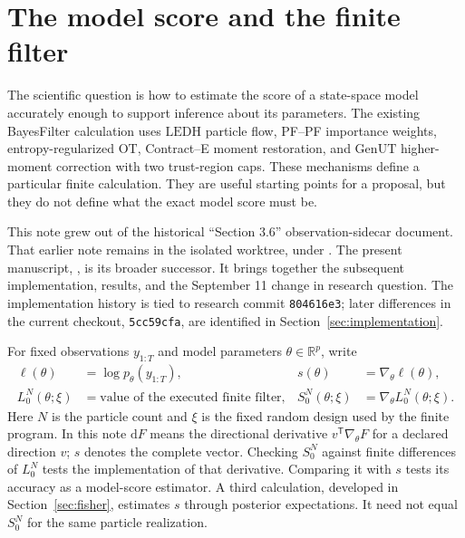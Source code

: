 \documentclass[11pt]{article}
\newcommand{\R}{\mathbb{R}}
\newcommand{\dd}{\mathrm{d}}
\newcommand{\LEDH}{\ensuremath{\mathrm{LEDH}}}
\newcommand{\GenUT}{\ensuremath{\mathrm{GenUT}}}
\newcommand{\OT}{\ensuremath{\mathrm{OT}}}
\begin{document}
\section{The model score and the finite filter}
\label{sec:question}

The scientific question is how to estimate the score of a state-space model
accurately enough to support inference about its parameters. The existing
BayesFilter calculation uses \LEDH{} particle flow, PF--PF importance weights,
entropy-regularized \OT{}, Contract--E moment restoration, and \GenUT{}
higher-moment correction with two trust-region caps. These mechanisms define
a particular finite calculation. They are useful starting points for a
proposal, but they do not define what the exact model score must be.

This note grew out of the historical ``Section 3.6'' observation-sidecar
document. That earlier note remains in the isolated
 worktree, under
. The present manuscript,
, is its
broader successor. It brings together the subsequent implementation, results,
and the September 11 change in research question. The implementation history
is tied to research commit \texttt{804616e3}; later differences in the current
checkout, \texttt{5cc59cfa}, are identified in Section~\ref{sec:implementation}.

For fixed observations $y_{1:T}$ and model parameters $\theta\in\R^p$, write
\begin{align}
 \ell(\theta)&=\log p_\theta(y_{1:T}), &
 s(\theta)&=\nabla_\theta\ell(\theta), \label{eq:exact-score}\\
 L_0^N(\theta;\xi)&=\text{value of the executed finite filter}, &
 S_0^N(\theta;\xi)&=\nabla_\theta L_0^N(\theta;\xi).
 \label{eq:finite-score}
\end{align}
Here $N$ is the particle count and $\xi$ is the fixed random design used by
the finite program. In this note $\dd F$ means the directional derivative
$v^\mathsf{T}\nabla_\theta F$ for a declared direction $v$; $s$ denotes the
complete vector. Checking $S_0^N$ against finite differences of $L_0^N$ tests
the implementation of that derivative. Comparing it with $s$ tests its
accuracy as a model-score estimator. A third calculation, developed in
Section~\ref{sec:fisher}, estimates $s$ through posterior expectations. It
need not equal $S_0^N$ for the same particle realization.
\end{document}
